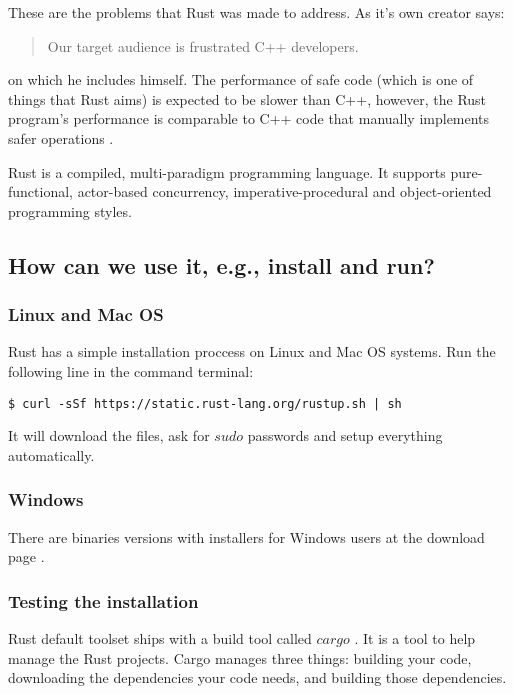 These are the problems that Rust was made to address. As it's own creator says:

\begin{quotation}
Our target audience is frustrated C++ developers. 
\end{quotation}

on which he includes himself. The performance of safe code (which is one of
things that Rust aims) is expected to be slower than C++, however, the Rust
program's performance is comparable to C++ code that manually implements safer
operations  \cite{7_9}. 

Rust is a compiled, multi-paradigm programming language. It supports
pure-functional, actor-based concurrency, imperative-procedural and
object-oriented programming styles.

\subsection{How can we use it, e.g., install and run?}

\subsubsection{Linux and Mac OS}

Rust has a simple installation proccess on Linux and Mac OS systems. Run the
following line in the command terminal:

\begin{verbatim}
$ curl -sSf https://static.rust-lang.org/rustup.sh | sh
\end{verbatim}

It will download the files, ask for $sudo$ passwords and setup everything
automatically.

\subsubsection{Windows}

There are binaries versions with installers for Windows users at the download
page  \cite{7_10}.

\subsubsection{Testing the installation}

Rust default toolset ships with a build tool called $cargo$
 \cite{7_11}. It is a tool to help manage the
Rust projects. Cargo manages three things: building your code, downloading the
dependencies your code needs, and building those dependencies.

